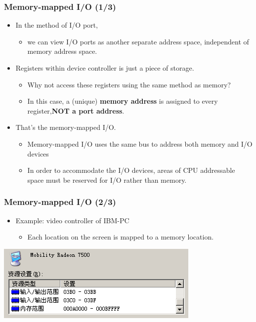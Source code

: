 \documentclass[CJKutf8,xcolor=pdftex,dvipsnames,table]{beamer}
\begin{document}
\begin{CJK*}{UTF8}{song}
  \begin{frame}
    \frametitle{Memory-mapped I/O (1/3)} \pause
    \begin{itemize}
    \item{In the method of I/O port,} \pause
      \begin{itemize}
      \item{we can view I/O ports as another separate address space, independent of memory address space.} \pause
      \end{itemize}
    \item{Registers within device controller is just a piece of storage.} \pause
      \begin{itemize}
      \item{Why not access these registers using the same method as memory?} \pause
      \item{In this case, a (unique) \textbf{memory address} is assigned to every register,\textbf{NOT a port address}.} \pause
      \end{itemize}
    \item{That's the memory-mapped I/O.} \pause
      \begin{itemize}
      \item{Memory-mapped I/O uses the same bus to address both memory and I/O devices} \pause
      \item{In order to accommodate the I/O devices, areas of CPU addressable space must be reserved for I/O rather than memory.}
      \end{itemize}
    \end{itemize}
  \end{frame}

  \begin{frame}
    \frametitle{Memory-mapped I/O (2/3)} \pause
    \begin{itemize}
    \item{Example: video controller of IBM-PC} \pause
      \begin{itemize}
      \item{Each location on the screen is mapped to a memory location.} \pause
      \end{itemize}
    \end{itemize}
    \begin{center}
      \includegraphics[scale=0.5]{ioportdisp}
    \end{center}
  \end{frame}


\end{CJK*}
\end{document}
